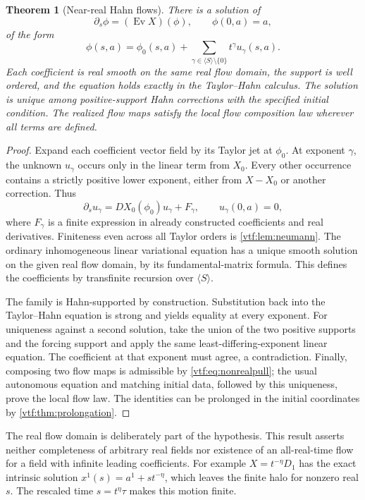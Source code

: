 \documentclass[11pt,letterpaper]{article}
\newtheorem{theorem}{Theorem}[section]
\theoremstyle{definition}
\theoremstyle{remark}
\newcommand{\ev}{\operatorname{Ev}}\newcommand{\jet}{\operatorname{J}}
\begin{document}
\begin{theorem}[Near-real Hahn flows]\label{vtf:thm:flow}
There is a solution of
\[
 \partial_s\phi=(\ev X)(\phi),\qquad \phi(0,a)=a,
\]
of the form
\[
 \phi(s,a)=\phi_0(s,a)+\sum_{\gamma\in\langle S\rangle\setminus\{0\}}
 t^\gamma u_\gamma(s,a).
\]
Each coefficient is real smooth on the same real flow domain, the support is
well ordered, and the equation holds exactly in the Taylor--Hahn calculus.
The solution is unique among positive-support Hahn corrections with the
specified initial condition. The realized flow maps satisfy the local flow
composition law wherever all terms are defined.
\end{theorem}
\begin{proof}
Expand each coefficient vector field by its Taylor jet at $\phi_0$.
At exponent $\gamma$, the unknown $u_\gamma$ occurs only in the linear term
from $X_0$. Every other occurrence contains a strictly positive lower
exponent, either from $X-X_0$ or another correction. Thus
\[
 \partial_s u_\gamma
 =DX_0(\phi_0)u_\gamma+F_\gamma,
 \qquad u_\gamma(0,a)=0,
\]
where $F_\gamma$ is a finite expression in already constructed coefficients
and real derivatives. Finiteness even across all Taylor orders is
\cref{vtf:lem:neumann}. The ordinary inhomogeneous linear variational equation
has a unique smooth solution on the given real flow domain, by its
fundamental-matrix formula. This defines the coefficients by transfinite
recursion over $\langle S\rangle$.

The family is Hahn-supported by construction. Substitution back into the
Taylor--Hahn equation is strong and yields equality at every exponent.
For uniqueness against a second solution, take the union of the two positive
supports and the forcing support and apply the same least-differing-exponent
linear equation. The coefficient at that exponent must agree, a contradiction.
Finally, composing two flow maps is admissible by \eqref{vtf:eq:nonrealpull};
the usual autonomous equation and matching initial data, followed by this
uniqueness, prove the local flow law. The identities can be prolonged in the
initial coordinates by \cref{vtf:thm:prolongation}.
\end{proof}

The real flow domain is deliberately part of the hypothesis. This result
asserts neither completeness of arbitrary real fields nor existence of an
all-real-time flow for a field with infinite leading coefficients.
For example $X=t^{-\eta}D_1$ has the exact intrinsic solution
$x^1(s)=a^1+s t^{-\eta}$, which leaves the finite halo for nonzero real $s$.
The rescaled time $s=t^\eta\tau$ makes this motion finite.
\end{document}

